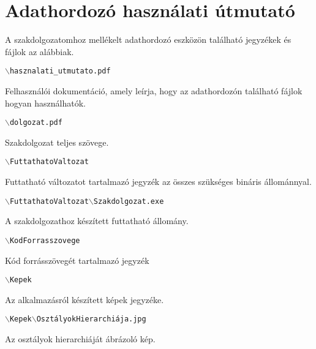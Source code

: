\chapter*{Adathordozó használati útmutató}



\noindent A szakdolgozatomhoz mellékelt adathordozó eszközön található jegyzékek és fájlok az alábbiak.

\bigskip

\noindent \texttt{$\backslash$hasznalati\_utmutato.pdf}

\medskip

Felhasználói dokumentáció, amely leírja, hogy az adathordozón található fájlok hogyan használhatók.

\bigskip

\noindent \texttt{$\backslash$dolgozat.pdf}

\medskip

Szakdolgozat teljes szövege.

\bigskip

\noindent \texttt{$\backslash$FuttathatoValtozat}

\medskip

Futtatható változatot tartalmazó jegyzék az összes szükséges bináris állománnyal.

\bigskip

\noindent \texttt{$\backslash$FuttathatoValtozat$\backslash$Szakdolgozat.exe}

\medskip

A szakdolgozathoz készített futtatható állomány.

\bigskip

\noindent \texttt{$\backslash$KodForrasszovege}

\medskip

Kód forrásszövegét tartalmazó jegyzék

\bigskip

\noindent \texttt{$\backslash$Kepek}

\medskip

Az alkalmazásról készített képek jegyzéke.

\bigskip

\noindent \texttt{$\backslash$Kepek$\backslash$OsztályokHierarchiája.jpg}

\medskip

Az osztályok hierarchiáját ábrázoló kép.

